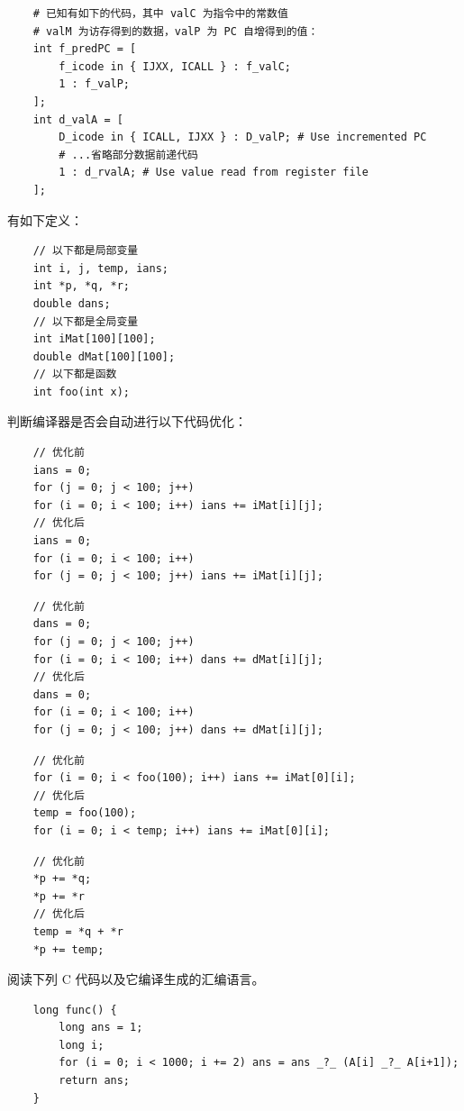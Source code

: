 \begin{problems}
\begin{verbatim}
    # 已知有如下的代码，其中 valC 为指令中的常数值
    # valM 为访存得到的数据，valP 为 PC 自增得到的值：
    int f_predPC = [
        f_icode in { IJXX, ICALL } : f_valC;
        1 : f_valP;
    ];
    int d_valA = [
        D_icode in { ICALL, IJXX } : D_valP; # Use incremented PC
        # ...省略部分数据前递代码
        1 : d_rvalA; # Use value read from register file
    ]; 
            \end{verbatim}
        \pro 有如下定义：
        \begin{verbatim}
    // 以下都是局部变量
    int i, j, temp, ians;
    int *p, *q, *r;
    double dans;
    // 以下都是全局变量
    int iMat[100][100];
    double dMat[100][100];
    // 以下都是函数
    int foo(int x);
        \end{verbatim}
        判断编译器是否会自动进行以下代码优化：
        \qn
        \begin{verbatim}
    // 优化前
    ians = 0;
    for (j = 0; j < 100; j++)
    for (i = 0; i < 100; i++) ians += iMat[i][j];
    // 优化后
    ians = 0;
    for (i = 0; i < 100; i++)
    for (j = 0; j < 100; j++) ians += iMat[i][j];
        \end{verbatim}
        \qn
        \begin{verbatim}
    // 优化前
    dans = 0;
    for (j = 0; j < 100; j++)
    for (i = 0; i < 100; i++) dans += dMat[i][j];
    // 优化后
    dans = 0;
    for (i = 0; i < 100; i++)
    for (j = 0; j < 100; j++) dans += dMat[i][j];
        \end{verbatim}
        \qn
        \begin{verbatim}
    // 优化前
    for (i = 0; i < foo(100); i++) ians += iMat[0][i];
    // 优化后
    temp = foo(100);
    for (i = 0; i < temp; i++) ians += iMat[0][i];
        \end{verbatim}
        \qn
        \begin{verbatim}
    // 优化前
    *p += *q;
    *p += *r
    // 优化后
    temp = *q + *r
    *p += temp;
        \end{verbatim}
        \pro 阅读下列 C 代码以及它编译生成的汇编语言。
        \begin{verbatim}
    long func() {
        long ans = 1;
        long i;
        for (i = 0; i < 1000; i += 2) ans = ans _?_ (A[i] _?_ A[i+1]);
        return ans;
    }
        \end{verbatim}

\end{problems}
